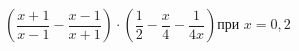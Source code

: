 \begin{ex}[type=expr_calc]
	\begin{condition}
		\( \left( \dfrac{x+1}{x-1}-\dfrac{x-1}{x+1} \right)\cdot\left( \dfrac{1}{2}-\dfrac{x}{4}-\dfrac{1}{4x} \right) \)\hspace{0.5cm}при \( x=0,2 \)
	\end{condition}
\end{ex}